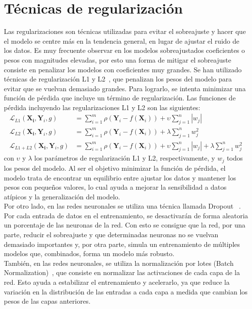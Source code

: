 \documentclass[11pt]{book}
\theoremstyle{plain} %
\theoremstyle{definition} %
\begin{document}
\section{Técnicas de regularización}
Las regularizaciones son técnicas utilizadas para evitar el sobreajuste 
y hacer que el modelo
se centre más en la tendencia general, en lugar 
de ajustar el ruido de los datos. Es muy frecuente observar en los modelos 
sobreajustados coeficientes o pesos con magnitudes elevadas, por esto 
una forma de mitigar el sobreajuste consiste en penalizar los modelos con 
coeficientes muy grandes. 
Se han utilizado técnicas de regularización L1 y L2~\cite{NG04}, que penalizan
los pesos del modelo para evitar que se vuelvan demasiado grandes.
Para lograrlo, se intenta minimizar una función de pérdida que incluye un 
término de regularización. Las funciones de pérdida incluyendo las 
regularizaciones L1 y L2 son las siguientes:
\begin{align*}
   \mathcal{L}_{L1}(\mathbf{X_i}, \mathbf{Y}_i, g) &= \sum_{i=1}^m \rho(\mathbf{Y}_i - f(\mathbf{X}_i)) + \upsilon \sum_{j=1}^n |w_j| \\
   \mathcal{L}_{L2}(\mathbf{X_i}, \mathbf{Y}_i, g) &= \sum_{i=1}^m \rho(\mathbf{Y}_i - f(\mathbf{X}_i)) + \lambda \sum_{j=1}^n w_j^2 \\
   \mathcal{L}_{L1+L2}(\mathbf{X_i}, \mathbf{Y}_i, g) &= \sum_{i=1}^m \rho(\mathbf{Y}_i - f(\mathbf{X}_i)) + \upsilon \sum_{j=1}^n |w_j| + \lambda \sum_{j=1}^n w_j^2
\end{align*}
con $\upsilon$ y $\lambda$ los parámetros de regularización L1 y L2, 
respectivamente, y $w_j$ todos los pesos del modelo. Al ser el objetivo 
minimizar la función de pérdida, el modelo trata de encontrar un equilibrio 
entre ajustar los datos y mantener los pesos con pequeños valores, 
lo cual ayuda a mejorar la sensibilidad a datos atípicos y la generalización 
del modelo.\\

Por otro lado, en las redes neuronales se utiliza una técnica llamada 
Dropout~\cite{SHKSS14} . Por cada entrada de datos en el entrenamiento, 
se desactivarán de forma aleatoria un porcentaje de las neuronas de la red. 
Con esto se consigue que la red, por una parte, reducir el sobreajuste y 
que determinadas neuronas no se vuelvan demasiado importantes y, 
por otra parte, simula un entrenamiento de múltiples modelos que, 
combinados, forma un modelo más robusto.\\

También, en las redes neuronales, se utiliza la normalización por 
lotes (Batch Normalization)~\cite{IS15}, que consiste en normalizar las 
activaciones de cada capa de la red. Esto ayuda a estabilizar el entrenamiento 
y acelerarlo, ya que reduce la variación en la distribución
de las entradas a cada capa a medida que cambian los pesos de las 
capas anteriores. 
\end{document}
